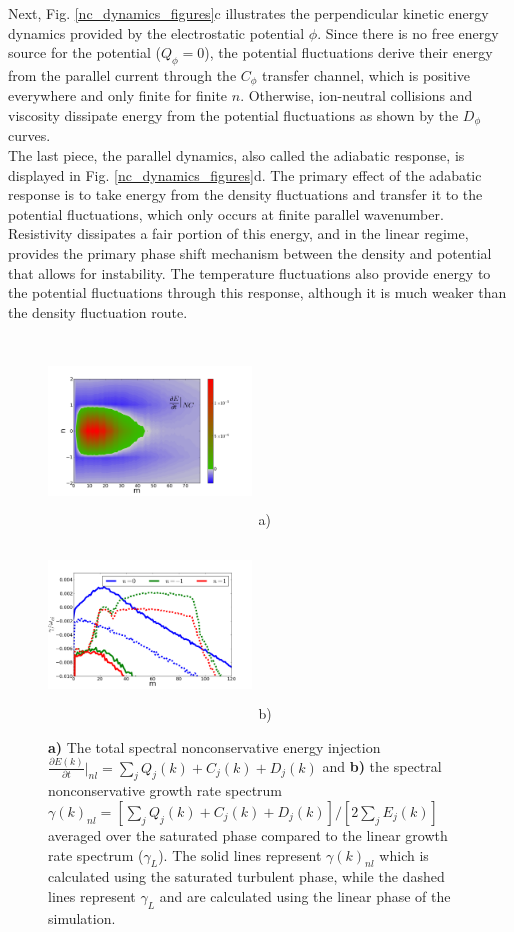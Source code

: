 \documentclass[12pt]{article}
\newcommand{\pdiff}[2]{\frac{\partial#1}{\partial#2}}
\begin{document}
Next, Fig. \ref{nc_dynamics_figures}c illustrates the perpendicular kinetic energy dynamics provided by the electrostatic potential $\phi$. 
Since there is no free energy source for the potential ($Q_\phi=0$),
the potential fluctuations derive their energy from the parallel current through the $C_\phi$ transfer channel, which is positive everywhere and only finite for finite $n$. Otherwise, ion-neutral
collisions and viscosity dissipate energy from the potential fluctuations as shown by the $D_\phi$ curves. \\

The last piece, the parallel dynamics, also called the adiabatic response, is displayed in Fig. \ref{nc_dynamics_figures}d. 
The primary effect of the adabatic response is to take energy from the density
fluctuations and transfer it to the potential fluctuations, which only occurs at finite parallel wavenumber. Resistivity dissipates a fair portion of this energy, and in the linear regime, provides
the primary phase shift mechanism between the density and potential that allows for instability. The temperature fluctuations also provide energy to the potential fluctuations
through this response, although it is much weaker than the density fluctuation route. \\

\begin{figure}
\includegraphics[width=0.48\textwidth,height=50mm]{dEdt_nc}~a)
\hfil
\includegraphics[width=0.48\textwidth,height=50mm]{lin_vs_nl_standard}~b)
\hfil
\caption{\textbf{a)} The total spectral nonconservative energy injection $\pdiff{E(k)}{t} \big|_{nl} = \sum_j Q_j(k) + C_j(k) + D_j(k)$ and
\textbf{b)} the spectral nonconservative growth rate spectrum $\gamma(k)_{nl} = [\sum_j Q_j(k) + C_j(k) + D_j(k)]/[2 \sum_j E_j(k)]$ averaged over the saturated phase
compared to the linear growth rate spectrum ($\gamma_L$). The solid lines represent $\gamma(k)_{nl}$ which is calculated using the saturated turbulent phase, while the dashed lines
represent $\gamma_L$ and are calculated using the linear phase of the simulation.}
\label{dEdt_tot_fig}
\end{figure}
\end{document}
